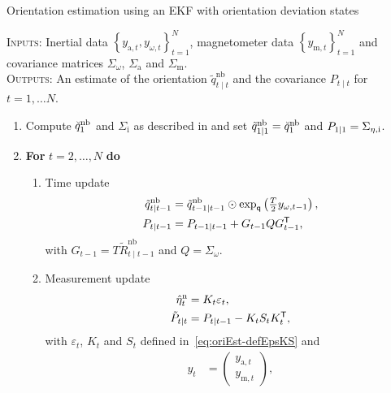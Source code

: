 \begin{algorithm}[ht]
\caption{\textsf{Orientation estimation using an EKF with orientation deviation states}}
\label{alg:oriEst-ekfOriError}
\small
\textsc{Inputs:} Inertial data $\left\{ y_{\text{a},t}, y_{\omega,t} \right\}_{t=1}^N$, magnetometer data $\left\{ y_{\text{m},t}\right\}_{t=1}^N$ and covariance matrices $\Sigma_\omega$, $\Sigma_\text{a}$ and $\Sigma_\text{m}$. \\
\textsc{Outputs:} An estimate of the orientation $\tilde{q}^\text{nb}_{t \mid t}$ and the covariance $P_{t \mid t}$ for $t = 1, \hdots N$.
\algrule[.4pt]
\begin{enumerate}
\item Compute $\breve{q}^\text{nb}_{1}$ and $\Sigma_\text{i}$ as described in  and set $\tilde{q}_{1 \mid 1}^\text{nb} = \breve{q}_{1}^\text{nb}$ and $P_{1 \mid 1} = \Sigma_{\eta,\text{i}}$.
\item \textbf{For} $t = 2, \hdots, N$ \textbf{do}
\begin{enumerate}
\item Time update
\begin{subequations}
\begin{align}
\tilde{q}^{\text{nb}}_{t \mid t-1} &= \tilde{q}^{\text{nb}}_{t-1 \mid t-1} \odot \exp_\mathsf{q} \left( \tfrac{T}{2} y_{\omega,t-1} \right), \label{eq:oriErrorEKF_Txupdate} \\
P_{t \mid t-1} &= P_{t-1 \mid t-1} + G_{t-1} Q G_{t-1}^{\mathsf{T}}, \label{eq:oriErrorEKF_TPupdate}
\end{align}
\label{eq:oriErrorEKF_Tupdate}
\end{subequations}
with $G_{t-1} = T \tilde{R}_{t \mid t-1}^{\text{nb}}$ and $Q = \Sigma_\omega$.
\item Measurement update
\begin{subequations}
\begin{align}
\hat{\eta}_t^\text{n} &= K_t \varepsilon_t, \label{eq:oriErrorEKF_Mxupdate_alg} \\
\tilde{P}_{t \mid t} &= P_{t \mid t-1} - K_t S_t K_t^{\mathsf{T}}, \label{eq:oriErrorEKF_MPupdate_alg}
\end{align}
\label{eq:oriErrorEKF_Mupdate}
\end{subequations}
with $\varepsilon_t$, $K_t$ and $S_t$ defined in~\eqref{eq:oriEst-defEpsKS} and
\begin{align*}
y_t &= \begin{pmatrix} y_{\text{a},t} \\ y_{\text{m},t} \end{pmatrix}, 

\end{align*}
\end{enumerate}
\end{enumerate}
\end{algorithm}
